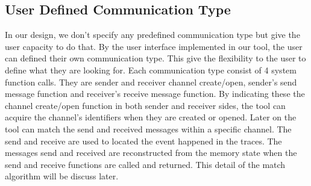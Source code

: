 \documentclass[paper=a4, fontsize=11pt]{scrartcl}
\numberwithin{equation}{section}		%
\numberwithin{figure}{section}			%
\numberwithin{table}{section}				%
\begin{document}
\subsection{User Defined Communication Type}
In our design, we don't specify any predefined communication type but give the user capacity to do that. By the user interface implemented in our tool, the user can defined their own communication type. This give the flexibility to the user to define what they are looking for. Each communication type consist of 4 system function calls. They are sender and receiver channel create/open, sender's send message function and receiver's receive message function. By indicating these the channel create/open function in both sender and receiver sides, the tool can acquire the channel's identifiers when they are created or opened. Later on the tool can match the send and received messages within a specific channel. The send and receive are used to located the event happened in the traces. The messages send and received are reconstructed from the memory state when the send and receive functions are called and returned. This detail of the match algorithm will be discuss later.
\end{document}
